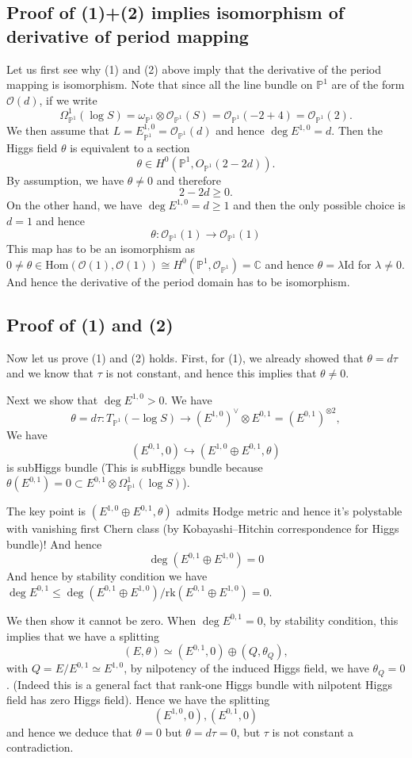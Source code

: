 \documentclass[11pt]{article}
\theoremstyle{definition}
\newcommand\PP{{\mathbb{P}}}
\begin{document}
\subsection{Proof of (1)+(2) implies isomorphism of derivative of period mapping}
Let us first see why (1) and (2) above imply that the derivative of the period mapping is isomorphism. Note that since all the line bundle on $\PP^1$ are of the form $\mathcal{O}(d)$, if we write $$\Omega_{\PP^1}^1(\log S) = \omega_{\PP^1}\otimes \mathcal{O}_{\PP^1}(S) = \mathcal{O}_{\PP^1}(-2+4) = \mathcal{O}_{\PP^1}(2). $$
We then assume that $L= E^{1,0}_{\PP^1} =\mathcal{O}_{\PP^1}(d)$ and hence $\deg E^{1,0} = d$. Then the Higgs field $\theta$ is equivalent to a section $$\theta \in H^0(\PP^1, O_{\PP^1}(2-2d)).$$By assumption, we have $\theta \ne 0$ and therefore $$2-2d \ge 0.$$On the other hand, we have $\deg E^{1,0} = d\ge 1$ and then the only possible choice is $d = 1$ and hence $$\theta : \mathcal{O}_{\PP^1}(1) \to \mathcal{O}_{\PP^1}(1)$$
This map has to be an isomorphism as $0\ne \theta \in \text{Hom}(\mathcal{O}(1) , \mathcal{O}(1)) \cong H^0(\PP^1 , \mathcal{O}_{\PP^1}) = \mathbb{C}$ and hence $\theta = \lambda \text{Id}$ for $\lambda\ne 0$. And hence the derivative of the period domain has to be isomorphism. 


\subsection{Proof of (1) and (2)}
Now let us prove (1) and (2) holds. First, for (1), we already showed that $\theta = d\tau$ and we know that $\tau$ is not constant, and hence this implies that $\theta \ne 0$. 

Next we show that $\deg E^{1,0} >0$. We have $$\theta = d \tau : T_{\PP^1}(-\log S) \to (E^{1,0})^\vee \otimes E^{0,1} = (E^{0,1})^{\otimes 2},$$We have $$(E^{0,1}, 0 )\hookrightarrow (E^{1,0}\oplus E^{0,1},\theta)$$is subHiggs bundle (This is subHiggs bundle because $\theta\left(E^{0,1}\right)=0 \subset E^{0,1} \otimes \Omega_{\mathbb{P}^1}^1(\log S) $). 

The key point is $(E^{1,0}\oplus E^{0,1},\theta)$ admits Hodge metric and hence it's polystable with vanishing first Chern class (by Kobayashi--Hitchin correspondence for Higgs bundle)! And hence $$\deg (E^{0,1}\oplus E^{1,0}) =0 $$And hence  by stability condition we have $\deg E^{0,1} \le \deg (E^{0,1}\oplus E^{1,0})/\text{rk}(E^{0,1}\oplus E^{1,0}) = 0$. 


We then show it cannot be zero. When $\deg E^{0,1}=0$, by stability condition, this implies that we have a splitting $$(E, \theta) \simeq\left(E^{0,1}, 0\right) \oplus\left(Q, \theta_Q\right),$$
with $Q=E / E^{0,1} \simeq E^{1,0}$, by nilpotency of the induced Higgs field, we have $\theta_Q = 0$. (Indeed this is a general fact that rank-one Higgs bundle with nilpotent Higgs field has zero Higgs field). Hence we have the splitting $$(E^{1,0}, 0 ),(E^{0,1},0)$$and hence we deduce that $\theta = 0$ but $\theta = d\tau = 0$, but $\tau$ is not constant a contradiction. 
\end{document}
